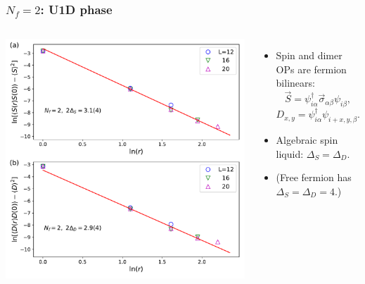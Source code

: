 \documentclass[xcolor=table, 10pt, aspectratio=43]{beamer}
\begin{document}
\begin{frame}
  \frametitle{$N_f=2$: U1D phase}
  \begin{columns}
    \includegraphics[width=\textwidth]{../u1sl/n2decay}
		\begin{itemize}
			\item Spin and dimer OPs are fermion bilinears:
			\[\vec S = \psi^\dagger_{i\alpha}\vec\sigma_{\alpha\beta}\psi_{i\beta},\]
			\[D_{x,y} = \psi^\dagger_{i\alpha}\psi_{i+x,y,\beta}.\]
			\item Algebraic spin liquid: $\Delta_S = \Delta_D$.
		  \item (Free fermion has $\Delta_S=\Delta_D = 4$.)
		\end{itemize}
  \end{columns}
\end{frame}
\end{document}
